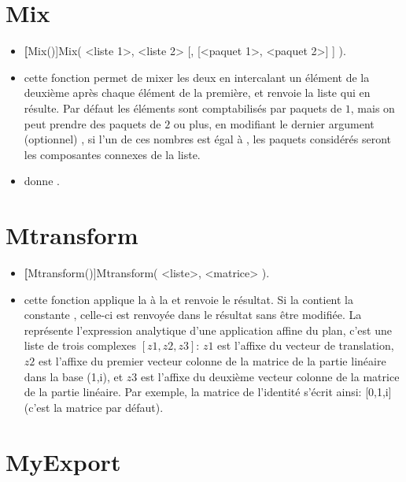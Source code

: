 \section{Mix}\label{cmdMix}

\begin{itemize}
 \item \util \textbf[Mix()]{Mix( <liste 1>, <liste 2> [, [<paquet 1>, <paquet 2>] ] )}.
 \item \desc cette fonction permet de mixer les deux  en intercalant un élément de la deuxième après chaque élément de la première, et renvoie la liste qui en résulte. Par défaut les éléments sont comptabilisés par paquets de $1$, mais on peut prendre des paquets de $2$ ou plus, en modifiant le dernier argument (optionnel) , si l'un de ces nombres est égal à \jump, les paquets considérés seront les composantes connexes de la liste.
 \item \exem {} donne .
\end{itemize} 
 
\section{Mtransform}\label{cmdMtransform}

\begin{itemize}
 \item \util \textbf[Mtransform()]{Mtransform( <liste>, <matrice> )}. 
 \item \desc cette fonction applique la  à la  et renvoie le résultat. Si la  contient la constante \jump, celle-ci est renvoyée dans le résultat sans être modifiée. La  représente l'expression analytique d'une application affine du plan, c'est une liste de trois complexes $[z1,z2,z3]$: $z1$ est l'affixe du vecteur de translation, $z2$ est l'affixe du premier vecteur colonne de la matrice de la partie linéaire dans la base (1,i), et $z3$ est l'affixe du deuxième vecteur colonne de la matrice de la partie linéaire. Par exemple, la matrice de l'identité s'écrit ainsi: [0,1,i] (c'est la matrice par défaut).
\end{itemize}

\section{MyExport}

